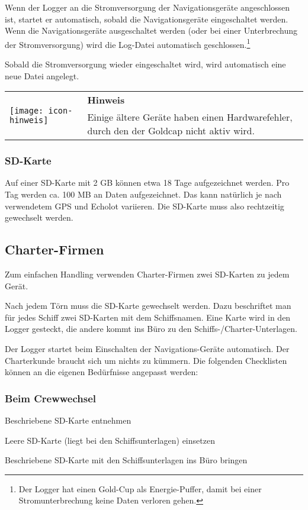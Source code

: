 \documentclass[pdftex, fontsize=8pt, paper=130mm:92mm,pagesize]{scrartcl}
\newlength{\iconwidth}
\newenvironment{displaybox}[2]{%
  \begin{center}
    \setlength\arrayrulewidth{0.75pt}%
    \arrayrulecolor{white}%
    \renewcommand{\arraystretch}{1.3}%
    \begin{tabular}{p{\iconwidth}p{\linewidth-4\tabcolsep-\iconwidth}}
      \multirow{2}{*}{#2}&\cellcolor{boxheadcol}\textbf{\color{white}#1} \\%
      \hhline{~-}%
      &\cellcolor{boxcol}%
}{%
      \\
    \end{tabular}
  \end{center}%
\arrayrulecolor{black}
}
\newenvironment{Hinweis}{%
\begin{displaybox}{Hinweis}{\texttt{[image: icon-hinweis]}}}%
{\end{displaybox}}
\begin{document}
Wenn der Logger an die Stromversorgung der Navigationsgeräte angeschlossen ist, startet er automatisch, sobald die Navigationsgeräte eingeschaltet werden. Wenn die Navigationsgeräte ausgeschaltet werden (oder bei einer Unterbrechung der Stromversorgung) wird die Log-Datei automatisch geschlossen.\footnote{Der Logger hat einen Gold-Cup als Energie-Puffer, damit bei einer Stromunterbrechung keine Daten verloren gehen.}

Sobald die Stromversorgung wieder eingeschaltet wird, wird automatisch eine neue Datei angelegt. 


\begin{Hinweis}
Einige ältere Geräte haben einen Hardwarefehler, durch den der Goldcap nicht aktiv wird.
\end{Hinweis}

\subsubsection{SD-Karte}

Auf einer SD-Karte mit 2 GB können etwa 18 Tage aufgezeichnet werden. Pro Tag werden ca. 100 MB an Daten aufgezeichnet. Das kann natürlich je nach verwendetem GPS und Echolot variieren. 
Die SD-Karte muss also rechtzeitig gewechselt werden. 

\subsection{Charter-Firmen}

Zum einfachen Handling verwenden Charter-Firmen zwei SD-Karten zu jedem Gerät. 

Nach jedem Törn muss die SD-Karte gewechselt werden. Dazu beschriftet man für jedes Schiff zwei SD-Karten mit dem Schiffsnamen. Eine Karte wird in den Logger gesteckt, die andere kommt ins Büro zu den Schiffs-/Charter-Unterlagen. 

Der Logger startet beim Einschalten der Navigations-Geräte automatisch. Der Charterkunde braucht sich um nichts zu kümmern. Die folgenden Checklisten können an die eigenen Bedürfnisse angepasst werden: 

\subsubsection{Beim Crewwechsel} 
\begin{compactenum}
\item Beschriebene SD-Karte entnehmen 
\item Leere SD-Karte (liegt bei den Schiffsunterlagen) einsetzen 
\item Beschriebene SD-Karte mit den Schiffsunterlagen ins Büro bringen 
\end{compactenum}
\end{document}
